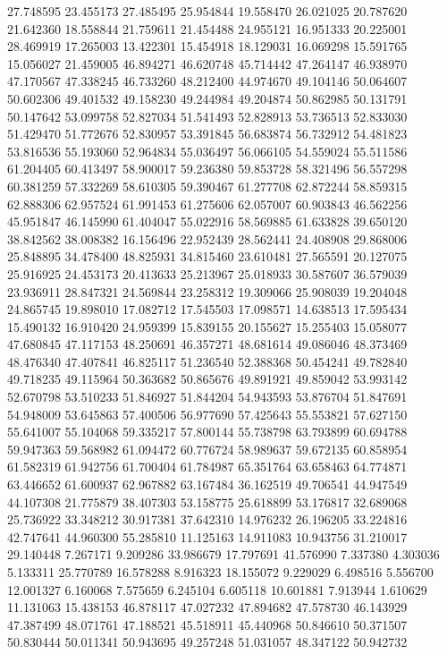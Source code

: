 27.748595
23.455173
27.485495
25.954844
19.558470
26.021025
20.787620
21.642360
18.558844
21.759611
21.454488
24.955121
16.951333
20.225001
28.469919
17.265003
13.422301
15.454918
18.129031
16.069298
15.591765
15.056027
21.459005
46.894271
46.620748
45.714442
47.264147
46.938970
47.170567
47.338245
46.733260
48.212400
44.974670
49.104146
50.064607
50.602306
49.401532
49.158230
49.244984
49.204874
50.862985
50.131791
50.147642
53.099758
52.827034
51.541493
52.828913
53.736513
52.833030
51.429470
51.772676
52.830957
53.391845
56.683874
56.732912
54.481823
53.816536
55.193060
52.964834
55.036497
56.066105
54.559024
55.511586
61.204405
60.413497
58.900017
59.236380
59.853728
58.321496
56.557298
60.381259
57.332269
58.610305
59.390467
61.277708
62.872244
58.859315
62.888306
62.957524
61.991453
61.275606
62.057007
60.903843
46.562256
45.951847
46.145990
61.404047
55.022916
58.569885
61.633828
39.650120
38.842562
38.008382
16.156496
22.952439
28.562441
24.408908
29.868006
25.848895
34.478400
48.825931
34.815460
23.610481
27.565591
20.127075
25.916925
24.453173
20.413633
25.213967
25.018933
30.587607
36.579039
23.936911
28.847321
24.569844
23.258312
19.309066
25.908039
19.204048
24.865745
19.898010
17.082712
17.545503
17.098571
14.638513
17.595434
15.490132
16.910420
24.959399
15.839155
20.155627
15.255403
15.058077
47.680845
47.117153
48.250691
46.357271
48.681614
49.086046
48.373469
48.476340
47.407841
46.825117
51.236540
52.388368
50.454241
49.782840
49.718235
49.115964
50.363682
50.865676
49.891921
49.859042
53.993142
52.670798
53.510233
51.846927
51.844204
54.943593
53.876704
51.847691
54.948009
53.645863
57.400506
56.977690
57.425643
55.553821
57.627150
55.641007
55.104068
59.335217
57.800144
55.738798
63.793899
60.694788
59.947363
59.568982
61.094472
60.776724
58.989637
59.672135
60.858954
61.582319
61.942756
61.700404
61.784987
65.351764
63.658463
64.774871
63.446652
61.600937
62.967882
63.167484
36.162519
49.706541
44.947549
44.107308
21.775879
38.407303
53.158775
25.618899
53.176817
32.689068
25.736922
33.348212
30.917381
37.642310
14.976232
26.196205
33.224816
42.747641
44.960300
55.285810
11.125163
14.911083
10.943756
31.210017
29.140448
7.267171
9.209286
33.986679
17.797691
41.576990
7.337380
4.303036
5.133311
25.770789
16.578288
8.916323
18.155072
9.229029
6.498516
5.556700
12.001327
6.160068
7.575659
6.245104
6.605118
10.601881
7.913944
1.610629
11.131063
15.438153
46.878117
47.027232
47.894682
47.578730
46.143929
47.387499
48.071761
47.188521
45.518911
45.440968
50.846610
50.371507
50.830444
50.011341
50.943695
49.257248
51.031057
48.347122
50.942732
